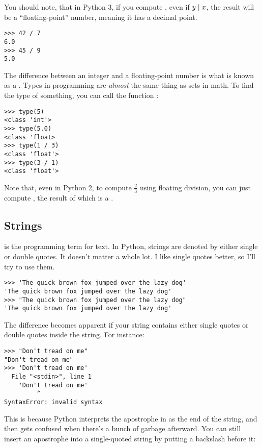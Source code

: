 You should note, that in Python 3, if you compute , even
if $y \mid x$, the result will be a ``floating-point'' number,
meaning it has a decimal point.

\begin{lstlisting}
>>> 42 / 7
6.0
>>> 45 / 9
5.0
\end{lstlisting}

The difference between an integer and a floating-point number is what
is known as a . Types in programming are \emph{almost} the
same thing as sets in math. To find the type of something, you can
call the function :

\begin{lstlisting}
>>> type(5)
<class 'int'>
>>> type(5.0)
<class 'float>
>>> type(1 / 3)
<class 'float'>
>>> type(3 / 1)
<class 'float'>
\end{lstlisting}

Note that, even in Python 2, to compute $\frac{2}{3}$ using floating
division, you can just compute , the result of which is
a .

\subsection{Strings}

 is the programming term for text. In Python, strings are
denoted by either single or double quotes. It doesn't matter a whole
lot. I like single quotes better, so I'll try to use them.

\begin{lstlisting}
>>> 'The quick brown fox jumped over the lazy dog'
'The quick brown fox jumped over the lazy dog'
>>> "The quick brown fox jumped over the lazy dog"
'The quick brown fox jumped over the lazy dog'
\end{lstlisting}

The difference becomes apparent if your string contains either single
quotes or double quotes inside the string. For instance:

\begin{lstlisting}
>>> "Don't tread on me"
"Don't tread on me"
>>> 'Don't tread on me'
  File "<stdin>", line 1
    'Don't tread on me'
         ^
SyntaxError: invalid syntax
\end{lstlisting}

This is because Python interprets the apostrophe in  as
the end of the string, and then gets confused when there's a bunch of
garbage afterward. You can still insert an apostrophe into a
single-quoted string by putting a backslash before it:


